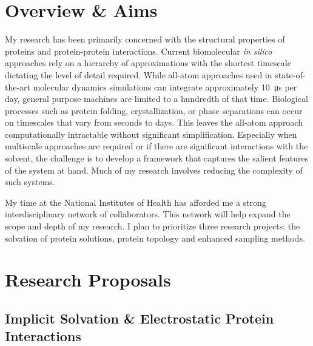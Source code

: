 \documentclass[]{scrartcl}
\newcommand{\insetpicture}[1]{\marginpar{\texttt{[image: \#1]}}}
\begin{document}
\begin{cleanCV}

\section{Overview \& Aims}

My research has been primarily concerned with the structural properties of proteins and protein-protein interactions.
Current biomolecular \textit{in silico} approaches rely on a hierarchy of approximations with the shortest timescale dictating the level of detail required.
While all-atom approaches used in state-of-the-art molecular dynamics simulations can integrate approximately 
\SI{10}{\micro\second} per day, general purpose machines are limited to a hundredth of that time.
Biological processes such as protein folding, crystallization, or phase separations can occur on timescales that vary from seconds to days. 
This leaves the all-atom approach computationally intractable without significant simplification.
\insetpicture{images/research/1AO6_cartoon}
Especially when multiscale approaches are required or if there are significant interactions with the solvent, the challenge is to develop a framework that captures the salient features of the system at hand.
Much of my research involves reducing the complexity of such systems.

My time at the National Institutes of Health has afforded me a strong interdisciplinary network of collaborators.
This network will help expand the scope and depth of my research.
I plan to prioritize three research projects: the solvation of protein solutions, protein topology and enhanced sampling methods.

\section{Research Proposals}
\subsection{Implicit Solvation \& Electrostatic Protein Interactions}


\end{cleanCV}
\end{document}
